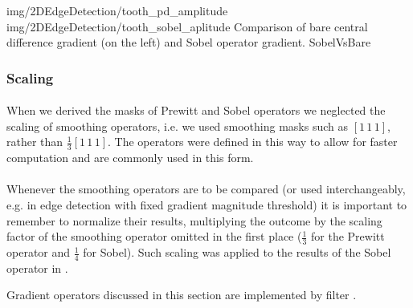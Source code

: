 \twoFigures
{img/2DEdgeDetection/tooth_pd_amplitude}
{img/2DEdgeDetection/tooth_sobel_aplitude}
{Comparison of bare central difference gradient (on the left) and Sobel operator gradient.}
{SobelVsBare}
{\basicWidth}


\subsubsection{Scaling}

\paragraph*{}
When we derived the masks of Prewitt and Sobel operators we neglected the scaling of smoothing operators, i.e. we used smoothing masks such as $[1 \, 1 \, 1]$, rather than $\frac{1}{3} [1 \, 1 \, 1]$. The operators were defined in this way to allow for faster computation and are commonly used in this form.

\paragraph*{}
Whenever the smoothing operators are to be compared (or used interchangeably, e.g. in edge detection with fixed gradient magnitude threshold) it is important to remember to normalize their results, multiplying the outcome by the scaling factor of the smoothing operator omitted in the first place ($\frac{1}{3}$ for the Prewitt operator and $\frac{1}{4}$ for Sobel). Such scaling was applied to the results of the Sobel operator in .

\begin{refImpl}
Gradient operators discussed in this section are implemented by \studio filter .
\end{refImpl}